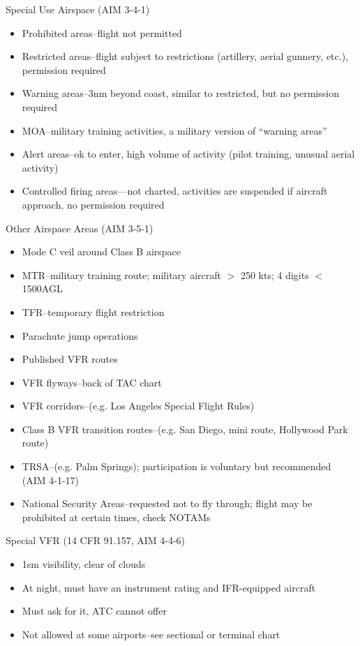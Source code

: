 Special Use Airspace (AIM 3-4-1)
\begin{itemize}
  \item Prohibited areas--flight not permitted
  \item Restricted areas--flight subject to restrictions (artillery, aerial
    gunnery, etc.), permission required
  \item Warning areas--3nm beyond coast, similar to restricted, but no
    permission required
  \item MOA--military training activities, a military version of ``warning
    areas''
  \item Alert areas--ok to enter, high volume of activity (pilot training,
    unusual aerial activity)
  \item Controlled firing areas—not charted, activities are suspended if
    aircraft approach, no permission required
\end{itemize}

Other Airspace Areas (AIM 3-5-1)
\begin{itemize}
  \item Mode C veil around Class B airspace
  \item MTR--military training route; military aircraft $>$ 250 kts; 4 digits $<$
    1500AGL
  \item TFR--temporary flight restriction
  \item Parachute jump operations
  \item Published VFR routes
  \item VFR flyways--back of TAC chart
  \item VFR corridors--(e.g. Los Angeles Special Flight Rules)
  \item Class B VFR transition routes--(e.g. San Diego, mini route, Hollywood
    Park route)
  \item TRSA--(e.g. Palm Springs); participation is voluntary but recommended
    (AIM 4-1-17)
  \item National Security Areas--requested not to fly through; flight may be
    prohibited at certain times, check NOTAMs
\end{itemize}

Special VFR (14 CFR 91.157, AIM 4-4-6)
\begin{itemize}
  \item 1sm visibility, clear of clouds
  \item At night, must have an instrument rating and IFR-equipped aircraft
  \item Must ask for it, ATC cannot offer
  \item Not allowed at some airports--see sectional or terminal chart
\end{itemize}

